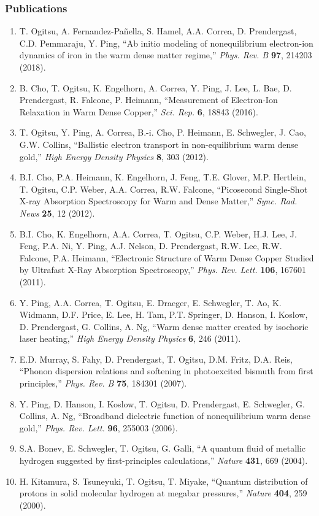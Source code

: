 \subsubsection*{Publications}
\begin{enumerate}
    \item T. Ogitsu, A. Fernandez-Pañella, S. Hamel, A.A. Correa, D. Prendergast, C.D. Pemmaraju, Y. Ping, “Ab initio modeling of nonequilibrium electron-ion dynamics of iron in the warm dense matter regime,” {\it Phys. Rev. B} {\bf 97}, 214203 (2018).
    \item B. Cho, T. Ogitsu, K. Engelhorn, A. Correa, Y. Ping, J. Lee, L. Bae, D. Prendergast, R. Falcone, P. Heimann, “Measurement of Electron-Ion Relaxation in Warm Dense Copper,” {\it Sci. Rep.} {\bf 6}, 18843 (2016).
    \item T. Ogitsu, Y. Ping, A. Correa, B.-i. Cho, P. Heimann, E. Schwegler, J. Cao, G.W. Collins, “Ballistic electron transport in non-equilibrium warm dense gold,” {\it High Energy Density Physics} {\bf 8}, 303 (2012).
    \item B.I. Cho, P.A. Heimann, K. Engelhorn, J. Feng, T.E. Glover, M.P. Hertlein, T. Ogitsu, C.P. Weber, A.A. Correa, R.W. Falcone, “Picosecond Single-Shot X-ray Absorption Spectroscopy for Warm and Dense Matter,” {\it Sync. Rad. News} {\bf 25}, 12 (2012).
    \item B.I. Cho, K. Engelhorn, A.A. Correa, T. Ogitsu, C.P. Weber, H.J. Lee, J. Feng, P.A. Ni, Y. Ping, A.J. Nelson, D. Prendergast, R.W. Lee, R.W. Falcone, P.A. Heimann, “Electronic Structure of Warm Dense Copper Studied by Ultrafast X-Ray Absorption Spectroscopy,” {\it Phys. Rev. Lett.} {\bf 106}, 167601 (2011).
    \item Y. Ping, A.A. Correa, T. Ogitsu, E. Draeger, E. Schwegler, T. Ao, K. Widmann, D.F. Price, E. Lee, H. Tam, P.T. Springer, D. Hanson, I. Koslow, D. Prendergast, G. Collins, A. Ng, “Warm dense matter created by isochoric laser heating,” {\it High Energy Density Physics} {\bf 6}, 246 (2011).
    \item E.D. Murray, S. Fahy, D. Prendergast, T. Ogitsu, D.M. Fritz, D.A. Reis, “Phonon dispersion relations and softening in photoexcited bismuth from first principles,” {\it Phys. Rev. B} {\bf 75}, 184301 (2007).
    \item Y. Ping, D. Hanson, I. Koslow, T. Ogitsu, D. Prendergast, E. Schwegler, G. Collins, A. Ng, “Broadband dielectric function of nonequilibrium warm dense gold,” {\it Phys. Rev. Lett.} {\bf 96}, 255003 (2006).
    \item S.A. Bonev, E. Schwegler, T. Ogitsu, G. Galli, “A quantum fluid of metallic hydrogen suggested by first-principles calculations,” {\it Nature} {\bf 431}, 669 (2004).
    \item H. Kitamura, S. Tsuneyuki, T. Ogitsu, T. Miyake, “Quantum distribution of protons in solid molecular hydrogen at megabar pressures,” {\it Nature} {\bf 404}, 259 (2000).
\end{enumerate}

